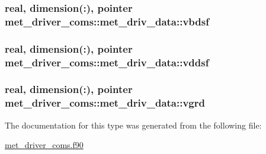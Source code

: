 \subsubsection[{\texorpdfstring{vbdsf}{vbdsf}}]{\setlength{\rightskip}{0pt plus 5cm}real, dimension(\+:), pointer met\+\_\+driver\+\_\+coms\+::met\+\_\+driv\+\_\+data\+::vbdsf}\hypertarget{structmet__driver__coms_1_1met__driv__data_a076a15466aba5e50972a1cee79503844}{}\label{structmet__driver__coms_1_1met__driv__data_a076a15466aba5e50972a1cee79503844}
\subsubsection[{\texorpdfstring{vddsf}{vddsf}}]{\setlength{\rightskip}{0pt plus 5cm}real, dimension(\+:), pointer met\+\_\+driver\+\_\+coms\+::met\+\_\+driv\+\_\+data\+::vddsf}\hypertarget{structmet__driver__coms_1_1met__driv__data_aadd9f7e24cc74f369724dd6443717e69}{}\label{structmet__driver__coms_1_1met__driv__data_aadd9f7e24cc74f369724dd6443717e69}
\subsubsection[{\texorpdfstring{vgrd}{vgrd}}]{\setlength{\rightskip}{0pt plus 5cm}real, dimension(\+:), pointer met\+\_\+driver\+\_\+coms\+::met\+\_\+driv\+\_\+data\+::vgrd}\hypertarget{structmet__driver__coms_1_1met__driv__data_a1bdf2521eb3332db96d2127a7d5a0294}{}\label{structmet__driver__coms_1_1met__driv__data_a1bdf2521eb3332db96d2127a7d5a0294}


The documentation for this type was generated from the following file\+:\begin{DoxyCompactItemize}
\item 
\hyperlink{met__driver__coms_8f90}{met\+\_\+driver\+\_\+coms.\+f90}\end{DoxyCompactItemize}
